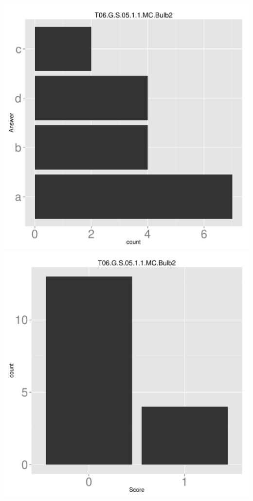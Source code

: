 \documentclass[12pt,nohyper]{tufte-handout}\usepackage[]{graphicx}\usepackage[]{color}
\begin{document}
\begin{center} \includegraphics[width=.45\linewidth]{Topic06_76_answer} \includegraphics[width=.45\linewidth]{Topic06_76_score} \end{center} 
\end{document}
